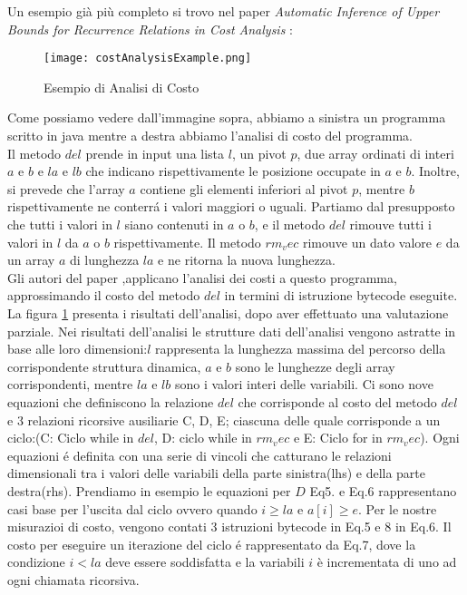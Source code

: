 \documentclass[../../main.tex]{subfiles}
\begin{document}
Un esempio già più completo si trovo nel paper \textit{Automatic Inference of Upper Bounds for Recurrence Relations in Cost Analysis} \autocite{albert2008automatic}:
\begin{figure}[H]
    \centering
    \texttt{[image: costAnalysisExample.png]}
    \caption{Esempio di Analisi di Costo}
    \label{fig:costAnalysisExample}
\end{figure}
Come possiamo vedere dall'immagine sopra, abbiamo a sinistra un programma scritto in java mentre a destra abbiamo l'analisi di costo del programma.\\
Il metodo $del$ prende in input una lista $l$, un pivot $p$, due array ordinati di interi $a$ e $b$ e $la$ e $lb$ che indicano rispettivamente le posizione occupate in $a$ e $b$.
Inoltre, si prevede che l'array $a$ contiene gli elementi inferiori al pivot $p$, mentre $b$ rispettivamente ne conterrá i valori maggiori o uguali.
Partiamo dal presupposto che tutti i valori in $l$ siano contenuti in $a$ o $b$, e il metodo $del$ rimouve tutti i valori in $l$ da $a$ o $b$ rispettivamente.
Il metodo $rm_vec$ rimouve un dato valore $e$ da un array $a$ di lunghezza $la$ e ne ritorna la nuova lunghezza.\\
Gli autori del paper \autocite{albert2008automatic},applicano l'analisi dei costi a questo programma, approssimando il costo del metodo $del$ in termini di istruzione bytecode eseguite.\\
La figura \ref{fig:costAnalysisExample} presenta i risultati dell'analisi, dopo aver effettuato una valutazione parziale.
Nei risultati dell'analisi le strutture dati dell'analisi vengono astratte in base alle loro dimensioni:$l$ rappresenta la lunghezza massima del percorso della corrispondente struttura dinamica, $a$ e $b$ sono le lunghezze degli array corrispondenti, mentre $la$ e $lb$ sono i valori interi delle variabili.
Ci sono nove equazioni che definiscono la relazione $ del $ che corrisponde al costo del metodo $del$ e 3 relazioni ricorsive ausiliarie C, D, E; ciascuna delle quale corrisponde a un ciclo:(C: Ciclo while in $del$, D: ciclo while in $rm_vec$ e E: Ciclo for in $rm_vec$).
Ogni equazioni é definita con una serie di vincoli che catturano le relazioni dimensionali tra i valori delle variabili della parte sinistra(lhs) e della parte destra(rhs).
Prendiamo in esempio le equazioni per $D$ Eq5. e Eq.6 rappresentano casi base per l'uscita dal ciclo ovvero quando $i \geq la$ e $a[i]\geq e$.
Per le nostre misurazioi di costo, vengono contati 3 istruzioni bytecode in Eq.5 e 8 in Eq.6.
Il costo per eseguire un iterazione del ciclo é rappresentato da Eq.7, dove la condizione $i < la$ deve essere soddisfatta e la variabili $i$ è incrementata di uno ad ogni chiamata ricorsiva.
\end{document}
